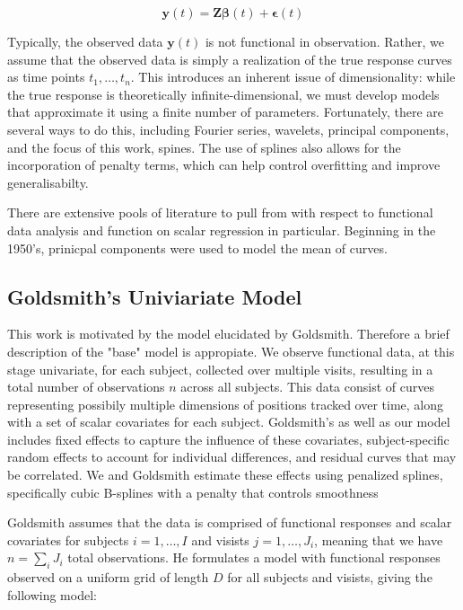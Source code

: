 \documentclass[AMA,Times1COL]{WileyNJDv5} %
\begin{document}
\begin{equation}
    \boldsymbol{y}\left(t\right) = \boldsymbol{Z}\boldsymbol{\beta}\left(t\right) + \boldsymbol{\epsilon}\left(t\right)
\end{equation}

Typically, the observed data \(\boldsymbol{y}\left(t\right)\) is not functional in observation.  Rather, we assume that the observed data is simply a realization of the true response curves as time points \(t_1, \dots,t_n\)\cite{reiss_fast_2010}.  This introduces an inherent issue of dimensionality: while the true response is theoretically infinite-dimensional, we must develop models that approximate it using a finite number of parameters.  Fortunately, there are several ways to do this, including Fourier series, wavelets, principal components, and the focus of this work, spines\cite{morris_functional_2015}.  The use of splines also allows for the incorporation of penalty terms, which can help control overfitting and improve generalisabilty.

There are extensive pools of literature to pull from with respect to functional data analysis and function on scalar regression in particular.  Beginning in the 1950's, prinicpal components were used to model the mean of curves.  

\subsection{Goldsmith's Univiariate Model}
This work is motivated by the model elucidated by Goldsmith.  Therefore a brief description of the "base" model is appropiate.  We observe functional data, at this stage univariate, for each subject, collected over multiple visits, resulting in a total number of observations \(n\) across all subjects.  This data consist of curves representing possibily multiple dimensions of positions tracked over time, along with a set of scalar covariates for each subject.  Goldsmith's as well as our model includes fixed effects to capture the influence of these covariates, subject-specific random effects to account for individual differences, and residual curves that may be correlated.  We and Goldsmith estimate these effects using penalized splines, specifically cubic B-splines with a penalty that controls smoothness

Goldsmith assumes that the data is comprised of functional responses and scalar covariates for subjects \(i=1,\dots, I\) and visists \(j=1,\dots, J_i\), meaning that we have \(n = \sum_{i}J_i\) total observations.  He formulates a model with functional responses observed on a uniform grid of length \(D\) for all subjects and visists, giving the following model:
\end{document}
